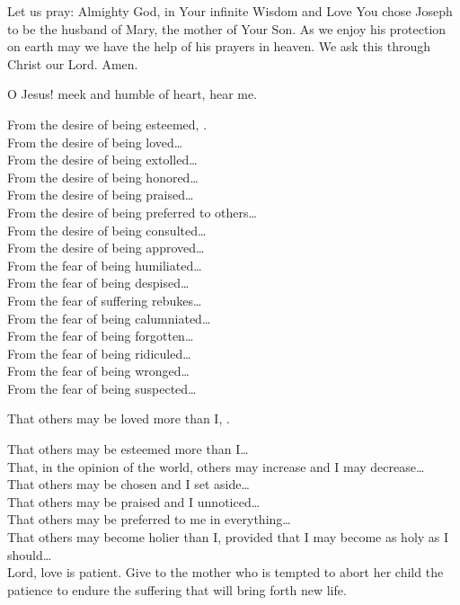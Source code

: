 Let us pray: Almighty God, in Your infinite Wisdom and Love You chose Joseph to be the husband of Mary, the mother of Your Son. As we enjoy his protection on earth may we have the help of his prayers in heaven. We ask this through Christ our Lord. Amen.

\label{prayer:litany_of_humility}
O Jesus! meek and humble of heart, hear me.

From the desire of being esteemed, .\\
From the desire of being loved\ldots\\
From the desire of being extolled\ldots\\
From the desire of being honored\ldots\\
From the desire of being praised\ldots\\
From the desire of being preferred to others\ldots\\
From the desire of being consulted\ldots\\
From the desire of being approved\ldots\\
From the fear of being humiliated\ldots\\
From the fear of being despised\ldots\\
From the fear of suffering rebukes\ldots\\
From the fear of being calumniated\ldots\\
From the fear of being forgotten\ldots\\
From the fear of being ridiculed\ldots\\
From the fear of being wronged\ldots\\
From the fear of being suspected\ldots

That others may be loved more than I, .

That others may be esteemed more than I\ldots\\
That, in the opinion of the world, others may increase and I may decrease\ldots\\
That others may be chosen and I set aside\ldots\\
That others may be praised and I unnoticed\ldots\\
That others may be preferred to me in everything\ldots\\
That others may become holier than I, provided that I may become as holy as I should\ldots\\

\label{prayer:litany_for_life}
Lord, love is patient.
Give to the mother who is tempted to abort her child the patience to endure the suffering that will bring forth new life.

